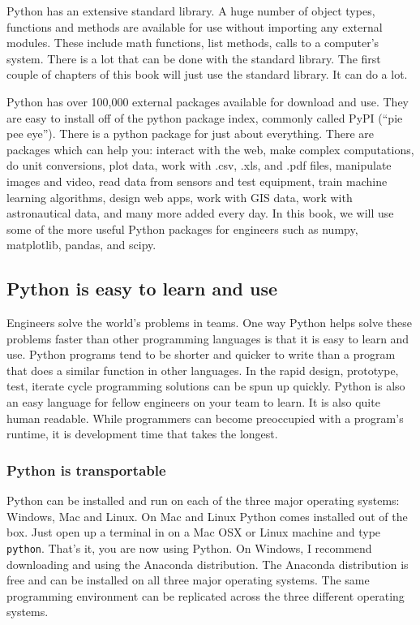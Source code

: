 \documentclass{book}
\begin{document}
Python has an extensive standard library. A huge number of object types,
functions and methods are available for use without importing any
external modules. These include math functions, list methods, calls to a
computer's system. There is a lot that can be done with the standard
library. The first couple of chapters of this book will just use the
standard library. It can do a lot.

Python has over 100,000 external packages available for download and
use. They are easy to install off of the python package index, commonly
called PyPI (``pie pee eye''). There is a python package for just about
everything. There are packages which can help you: interact with the
web, make complex computations, do unit conversions, plot data, work
with .csv, .xls, and .pdf files, manipulate images and video, read data
from sensors and test equipment, train machine learning algorithms,
design web apps, work with GIS data, work with astronautical data, and
many more added every day. In this book, we will use some of the more
useful Python packages for engineers such as numpy, matplotlib, pandas,
and scipy.
    




    
        \subsection{Python is easy to learn and
use}\label{python-is-easy-to-learn-and-use}

Engineers solve the world's problems in teams. One way Python helps
solve these problems faster than other programming languages is that it
is easy to learn and use. Python programs tend to be shorter and quicker
to write than a program that does a similar function in other languages.
In the rapid design, prototype, test, iterate cycle programming
solutions can be spun up quickly. Python is also an easy language for
fellow engineers on your team to learn. It is also quite human readable.
While programmers can become preoccupied with a program's runtime, it is
development time that takes the longest.

\subsubsection{Python is transportable}\label{python-is-transportable}

Python can be installed and run on each of the three major operating
systems: Windows, Mac and Linux. On Mac and Linux Python comes installed
out of the box. Just open up a terminal in on a Mac OSX or Linux machine
and type \texttt{python}. That's it, you are now using Python. On
Windows, I recommend downloading and using the Anaconda distribution.
The Anaconda distribution is free and can be installed on all three
major operating systems. The same programming environment can be
replicated across the three different operating systems.
\end{document}

